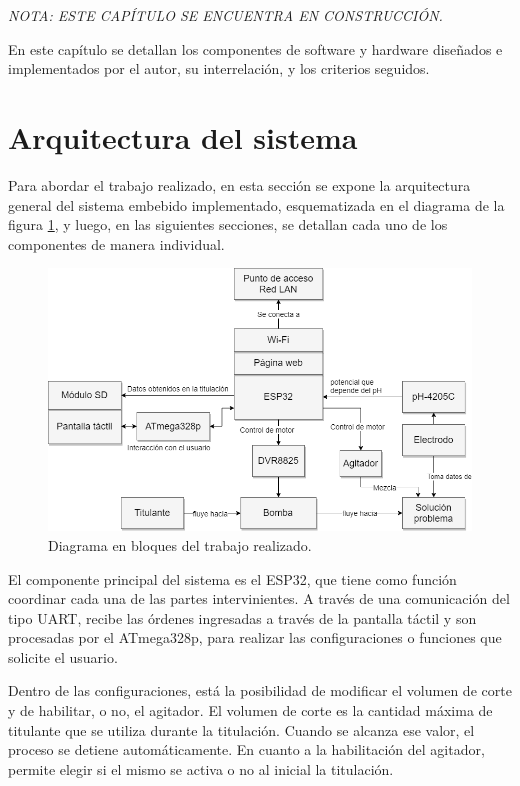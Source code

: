\textit{ NOTA: ESTE CAPÍTULO SE ENCUENTRA EN CONSTRUCCIÓN.}

En este capítulo se detallan los componentes de software y hardware diseñados e implementados por el autor, su interrelación, y los criterios seguidos.

\section{Arquitectura del sistema}

Para abordar el trabajo realizado, en esta sección se expone la arquitectura general del sistema embebido implementado, esquematizada en el diagrama de la figura \ref{fig:diagramaCompleto}, y luego, en las siguientes secciones, se detallan cada uno de los componentes de manera individual.

\begin{figure}[htbp]
	\centering
	\includegraphics[width=1.0\textwidth]{./Figures/DiagramaBloquesCompleto.png}
	\caption{Diagrama en bloques del trabajo realizado.}
	\label{fig:diagramaCompleto}
\end{figure}

El componente principal del sistema es el ESP32, que tiene como función coordinar cada una de las partes intervinientes. A través de una comunicación del tipo UART, recibe las órdenes ingresadas a través de la pantalla táctil y  son procesadas por el ATmega328p, para realizar las configuraciones o funciones que solicite el usuario.

Dentro de las configuraciones, está la posibilidad de modificar el volumen de corte y de habilitar, o no, el agitador. El volumen de corte es la cantidad máxima de titulante que se utiliza durante la titulación. Cuando se alcanza ese valor, el proceso se detiene automáticamente. En cuanto a la habilitación del agitador, permite elegir si el mismo se activa o no al inicial la titulación.

